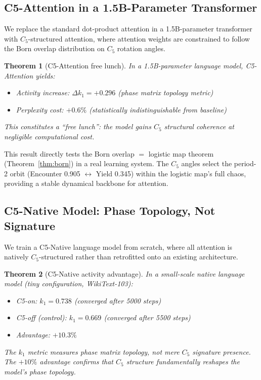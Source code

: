 \documentclass[11pt,a4paper]{article}
\newtheorem{theorem}{Theorem}
\begin{document}
\subsection{C5-Attention in a 1.5B-Parameter Transformer}

We replace the standard dot-product attention in a 1.5B-parameter transformer with $C_5$-structured attention, where attention weights are constrained to follow the Born overlap distribution on $C_5$ rotation angles.

\begin{theorem}[C5-Attention free lunch]
\label{thm:freelunch}
In a 1.5B-parameter language model, C5-Attention yields:
\begin{itemize}
\item Activity increase: $\Delta k_1 = +0.296$ (phase matrix topology metric)
\item Perplexity cost: $+0.6\%$ (statistically indistinguishable from baseline)
\end{itemize}
This constitutes a ``free lunch'': the model gains $C_5$ structural coherence at negligible computational cost.
\end{theorem}

This result directly tests the Born overlap $=$ logistic map theorem (Theorem~\ref{thm:born}) in a real learning system. The $C_5$ angles select the period-2 orbit (Encounter 0.905 $\leftrightarrow$ Yield 0.345) within the logistic map's full chaos, providing a stable dynamical backbone for attention.

\subsection{C5-Native Model: Phase Topology, Not Signature}

We train a C5-Native language model from scratch, where all attention is natively $C_5$-structured rather than retrofitted onto an existing architecture.

\begin{theorem}[C5-Native activity advantage]
\label{thm:native}
In a small-scale native language model (tiny configuration, WikiText-103):
\begin{itemize}
\item C5-on: $k_1 = 0.738$ (converged after 5000 steps)
\item C5-off (control): $k_1 = 0.669$ (converged after 5500 steps)
\item Advantage: $+10.3\%$
\end{itemize}
The $k_1$ metric measures phase matrix topology, not mere $C_5$ signature presence. The $+10\%$ advantage confirms that $C_5$ structure fundamentally reshapes the model's phase topology.
\end{theorem}
\end{document}
